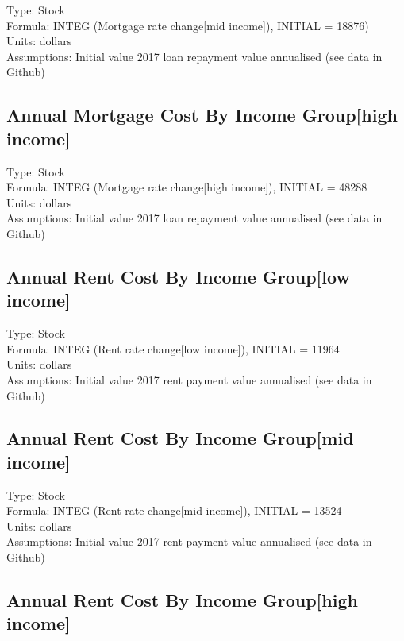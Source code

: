 \documentclass[
  11pt,
]{book}
\begin{document}
Type: Stock\\
Formula: INTEG (Mortgage rate change{[}mid income{]}), INITIAL = 18876)\\
Units: dollars\\
Assumptions: Initial value 2017 loan repayment value annualised (see data in Github)

\hypertarget{annual-mortgage-cost-by-income-grouphigh-income}{%
\subsection{Annual Mortgage Cost By Income Group{[}high income{]}}\label{annual-mortgage-cost-by-income-grouphigh-income}}

Type: Stock\\
Formula: INTEG (Mortgage rate change{[}high income{]}), INITIAL = 48288\\
Units: dollars\\
Assumptions: Initial value 2017 loan repayment value annualised (see data in Github)

\hypertarget{annual-rent-cost-by-income-grouplow-income}{%
\subsection{Annual Rent Cost By Income Group{[}low income{]}}\label{annual-rent-cost-by-income-grouplow-income}}

Type: Stock\\
Formula: INTEG (Rent rate change{[}low income{]}), INITIAL = 11964\\
Units: dollars\\
Assumptions: Initial value 2017 rent payment value annualised (see data in Github)

\hypertarget{annual-rent-cost-by-income-groupmid-income}{%
\subsection{Annual Rent Cost By Income Group{[}mid income{]}}\label{annual-rent-cost-by-income-groupmid-income}}

Type: Stock\\
Formula: INTEG (Rent rate change{[}mid income{]}), INITIAL = 13524\\
Units: dollars\\
Assumptions: Initial value 2017 rent payment value annualised (see data in Github)

\hypertarget{annual-rent-cost-by-income-grouphigh-income}{%
\subsection{Annual Rent Cost By Income Group{[}high income{]}}\label{annual-rent-cost-by-income-grouphigh-income}}
\end{document}
